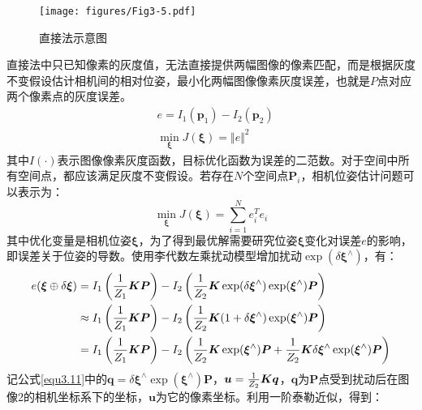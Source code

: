 \begin{figure}[h]
\centering
\texttt{[image: figures/Fig3-5.pdf]}
\caption{直接法示意图}
\label{fig3.5}
\end{figure}
\vspace{-20pt}

直接法中只已知像素的灰度值，无法直接提供两幅图像的像素匹配，而是根据灰度不变假设估计相机间的相对位姿，最小化两幅图像像素灰度误差，也就是$P$点对应两个像素点的灰度误差。
\begin{equation}
\label{equ3.9}
\begin{aligned}
& e = I_1(\boldsymbol{p}_1) - I_2(\boldsymbol{p}_2) 
\\ 
& \min\limits_{\boldsymbol{\xi}} J(\boldsymbol{\xi}) = \Vert e \Vert ^2
\end{aligned}
\end{equation}
其中$I(\cdot)$表示图像像素灰度函数，目标优化函数为误差的二范数。对于空间中所有空间点，都应该满足灰度不变假设。若存在$N$个空间点$\boldsymbol{P}_i$，相机位姿估计问题可以表示为：
\begin{equation}
\label{equ3.10}
\min\limits_{\boldsymbol{\xi}} J(\boldsymbol{\xi}) = \sum\limits_{i=1}^N e_i^T e_i
\end{equation}
其中优化变量是相机位姿$\boldsymbol{\xi}$，为了得到最优解需要研究位姿$\boldsymbol{\xi}$变化对误差$e$的影响，即误差关于位姿的导数。使用李代数左乘扰动模型增加扰动$\exp( \delta \boldsymbol{\xi}^{\wedge})$，有：
\begin{equation}
\label{equ3.11}
\begin{aligned}
e(\boldsymbol{\xi}\oplus \delta \boldsymbol{\xi}) & = I_1\left({1 \over Z_1} \boldsymbol{K} \boldsymbol{P} \right) - I_2\left({1 \over Z_2} \boldsymbol{K} \exp (\delta \boldsymbol{\xi}^{\wedge}) \exp (\boldsymbol{\xi}^{\wedge}) \boldsymbol{P} \right)
\\
& \approx I_1\left( {1 \over Z_1} \boldsymbol{K} \boldsymbol{P} \right) - I_2 \left( {1 \over Z_2} \boldsymbol{K} (1+\delta \boldsymbol{\xi}^{\wedge}) \exp (\boldsymbol{\xi}^{\wedge}) \boldsymbol{P} \right)
\\
& = I_1\left( {1 \over Z_1} \boldsymbol{K} \boldsymbol{P} \right) - I_2 \left({1 \over Z_2} \boldsymbol{K} \exp (\boldsymbol{\xi}^{\wedge}) \boldsymbol{P}+ {1 \over Z_2} \boldsymbol{K} \delta \boldsymbol{\xi}^{\wedge} \exp (\boldsymbol{\xi}^{\wedge}) \boldsymbol{P} \right)
\end{aligned}
\end{equation}
记公式\eqref{equ3.11}中的$\boldsymbol{q} = \delta \boldsymbol{\xi}^{\wedge} \exp (\boldsymbol{\xi}^{\wedge}) \boldsymbol{P} $，$\boldsymbol{u}={1 \over Z_2} \boldsymbol{K} \boldsymbol{q}$，$\boldsymbol{q}$为$\boldsymbol{P}$点受到扰动后在图像2的相机坐标系下的坐标，$\boldsymbol{u}$为它的像素坐标。利用一阶泰勒近似，得到：
